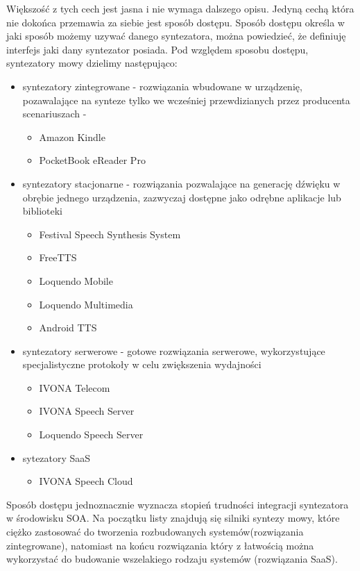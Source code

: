 Większość z tych cech jest jasna i nie wymaga dalszego opisu. Jedyną cechą która nie dokońca przemawia za siebie jest sposób dostępu. Sposób dostępu określa w jaki sposób możemy uzywać danego syntezatora, można powiedzieć, że definiuję interfejs jaki dany syntezator posiada. Pod względem sposobu dostępu, syntezatory mowy dzielimy następująco:

\begin{itemize}
	\item syntezatory zintegrowane  - rozwiązania wbudowane w urządzenię, pozawalające na synteze tylko we wcześniej przewdizianych przez producenta scenariuszach - 
		\begin{itemize}
			\item  Amazon Kindle
			\item  PocketBook eReader Pro
		\end{itemize}
	\item syntezatory stacjonarne - rozwiązania pozwalające na generację dźwięku w obrębie jednego urządzenia, zazwyczaj dostępne jako odrębne aplikacje lub biblioteki
		\begin{itemize}
			\item Festival Speech Synthesis System
			\item FreeTTS
			\item Loquendo Mobile
			\item Loquendo Multimedia
			\item Android TTS
		\end{itemize}
	\item syntezatory serwerowe - gotowe rozwiązania serwerowe, wykorzystujące specjalistyczne protokoły w celu zwiększenia wydajności 
		\begin{itemize}
			\item IVONA Telecom
			\item IVONA Speech Server
			\item Loquendo Speech Server
		\end{itemize}
	\item sytezatory SaaS
		\begin{itemize}
			\item IVONA Speech Cloud
		\end{itemize}
\end{itemize}

Sposób dostępu jednoznacznie wyznacza stopień trudności integracji syntezatora w środowisku SOA. Na początku listy znajdują się silniki syntezy mowy, które ciężko zastosować do tworzenia rozbudowanych systemów(rozwiązania zintegrowane), natomiast na końcu rozwiązania który z łatwością można wykorzystać do budowanie wszelakiego rodzaju systemów (rozwiązania SaaS).

